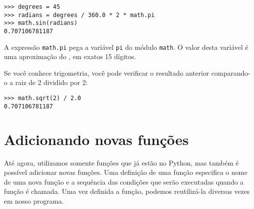 \beforeverb
\begin{verbatim}
>>> degrees = 45
>>> radians = degrees / 360.0 * 2 * math.pi
>>> math.sin(radians)
0.707106781187
\end{verbatim}
\afterverb
%
%
A expressão {\tt math.pi} pega a variável {\tt pi} do módulo {\tt math}. O
valor desta variável é uma aproximação do \pi, em exatos 15 dígitos.



Se você conhece trigometria, você pode verificar o resultado anterior
comparando-o a raiz de 2 dividido por 2:


\beforeverb
\begin{verbatim}
>>> math.sqrt(2) / 2.0
0.707106781187
\end{verbatim}
\afterverb
%


\section{Adicionando novas funções}


Até agora, utilizamos somente funções que já estão no Python, mas também é
possível adicionar novas funções. Uma definição de uma função especifica o
nome de uma nova função e a sequência das condições que serão executadas
quando a função é chamada. Uma vez definida a função, podemos reutilizá-la
diversas vezes em nosso programa.



